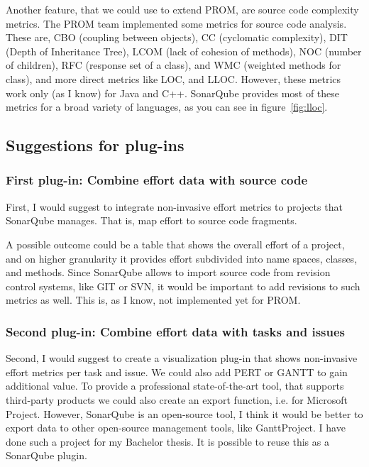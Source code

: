 Another feature, that we could use to extend PROM, are source code complexity
metrics. The PROM team implemented some metrics for source code analysis. These
are, CBO (coupling between objects),  CC (cyclomatic complexity), DIT (Depth of
Inheritance Tree), LCOM (lack of cohesion of methods), NOC (number of children),
RFC (response set of a class), and WMC (weighted methods for class), and more
direct metrics like LOC, and LLOC. However, these metrics work only (as I know)
for Java and C++. SonarQube provides most of these metrics for a broad variety
of languages, as you can see in figure~\ref{fig:lloc}.

\subsection{Suggestions for plug-ins}

\subsubsection{First plug-in: Combine effort data with source code}

First, I would suggest to integrate non-invasive effort metrics to projects that
SonarQube manages. That is, map effort to source code fragments. 

A possible outcome could be a table that shows the overall effort of a project,
and on higher granularity it provides effort subdivided into name spaces,
classes, and methods. Since SonarQube allows to import source code from revision
control systems, like GIT or SVN, it would be important to add revisions to such
metrics as well. This is, as I know, not implemented yet for PROM.

\subsubsection{Second plug-in: Combine effort data with tasks and issues}

Second, I would suggest to create a visualization plug-in that shows non-invasive
effort metrics per task and issue. We could also add PERT or GANTT to gain
additional value. To provide a professional state-of-the-art tool, that supports
third-party products we could also create an export function, i.e. for Microsoft
Project. However, SonarQube is an open-source tool, I think it would be better
to export data to other open-source management tools, like GanttProject. I have
done such a project for my Bachelor thesis. It is possible to reuse this as a
SonarQube plugin.

